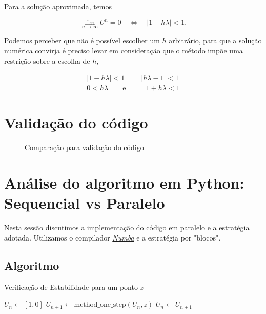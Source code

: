 \documentclass[a4paper,12pt]{article}
\begin{document}
Para a solução aproximada, temos

\begin{equation*}
    \lim_{n \to \infty} U^{n} = 0 \quad \Longleftrightarrow \quad |1 - h\lambda| < 1.
\end{equation*}

Podemos perceber que não é possível escolher um $h$ arbitrário, para que a solução numérica convirja é preciso levar em consideração que o método impõe uma restrição sobre a escolha de $h$, 

\begin{align}
    |1 - h\lambda| < 1  & = |h\lambda - 1| < 1\\
     0 < h\lambda  \qquad \mbox{e} & \qquad 1 + h\lambda < 1
\end{align}

\section{Validação do código}
\begin{figure}[H]
\centering
{} %
\quad %
\caption{Comparação para validação do código}
\label{fig:euler_implicito}
\end{figure}



\section{Análise do algoritmo em Python: Sequencial vs Paralelo}

Nesta sessão discutimos a implementação do código em paralelo e a estratégia adotada. Utilizamos o compilador \textit{\href{https://numba.pydata.org/}{Numba}} e a estratégia por "blocos".

\subsection{Algoritmo}

\begin{algorithm}
\caption{Verificação de Estabilidade para um ponto \( z \)}
\label{alg:stability}
\begin{algorithmic}[1]
\STATE $U_n \gets [1, 0]$ 
    \STATE $U_{n+1} \gets \text{method\_one\_step}(U_n, z)$ 
    \STATE $U_n \gets U_{n+1}$
         
         
    \ENDIF
\ENDFOR
{} 
\end{algorithmic}
\end{algorithm}
\end{document}
